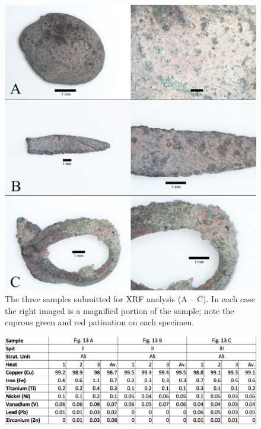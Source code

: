 	\begin{figure} %
		\includegraphics[width=\linewidth]{figures/Forssman-Figure12}
		\caption{The three samples submitted for XRF analysis (A – C). In each case the right imaged is a magnified portion of the sample; note the cuprous green and red patination on each specimen.}
		\label{fig:Forssman-Figure12}
	\end{figure}

    	\begin{figure} %
    		\includegraphics[width=\linewidth]{figures/Forssman-Table06}
    		\centering
    		\label{fig:Forssman-Table06}
    	\end{figure}

